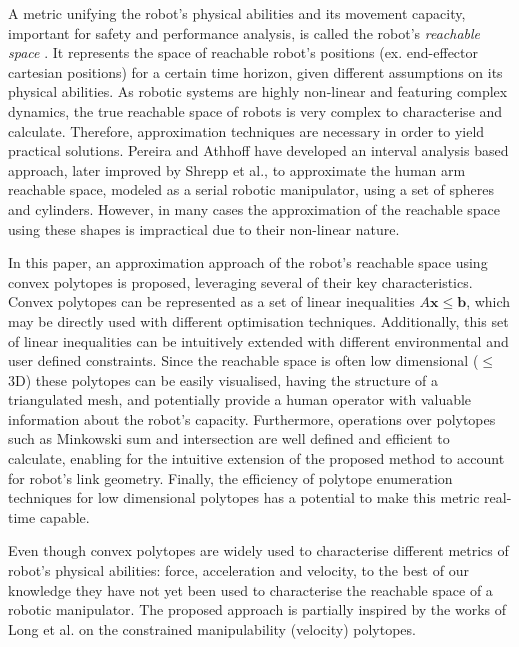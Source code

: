 A metric unifying the robot's physical abilities and its movement capacity, important for safety and performance analysis, is called the robot's \textit{reachable space} \cite{althoff2014}. It represents the space of reachable robot's positions (ex. end-effector cartesian positions) for a certain time horizon, given different assumptions on its physical abilities. As robotic systems are highly non-linear and featuring complex dynamics, the true reachable space of robots is very complex to characterise and calculate. Therefore, approximation techniques are necessary in order to yield practical solutions. Pereira and Athhoff\cite{pereira2017} have developed an interval analysis based approach, later improved by Shrepp et al.\cite{schepp2022}, to approximate the human arm reachable space, modeled as a serial robotic manipulator, using a set of spheres and cylinders. However, in many cases the approximation of the reachable space using these shapes is impractical due to their non-linear nature.

In this paper, an approximation approach of the robot's reachable space using convex polytopes is proposed, leveraging several of their key characteristics. Convex polytopes can be represented as a set of linear inequalities $A\bm{x}\leq\bm{b}$, which may be directly used with different optimisation techniques. Additionally, this set of linear inequalities can be intuitively extended with different environmental and user defined constraints. Since the reachable space is often low dimensional ($\leq$3D) these polytopes can be easily visualised, having the structure of a triangulated mesh, and potentially provide a human operator with valuable information about the robot's capacity. Furthermore, operations over polytopes such as Minkowski sum and intersection are well defined and efficient to calculate, enabling for the intuitive extension of the proposed method to account for robot's link geometry. Finally, the efficiency of polytope enumeration techniques for low dimensional polytopes has a potential to make this metric real-time capable. 

Even though convex polytopes are widely used to characterise different metrics of robot's physical abilities\cite{skuric2021}: force, acceleration  and velocity, to the best of our knowledge they have not yet been used to characterise the reachable space of a robotic manipulator. 
The proposed approach is partially inspired by the works of Long et al. \cite{long2018} on the constrained manipulability (velocity) polytopes.  

